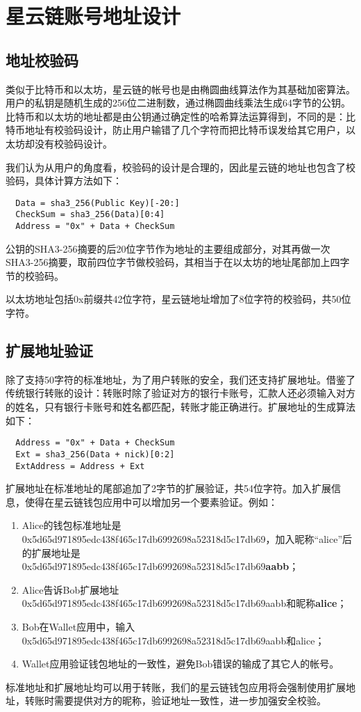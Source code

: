 \section{星云链账号地址设计}

\subsection{地址校验码}
类似于比特币和以太坊，星云链的帐号也是由椭圆曲线算法作为其基础加密算法。
用户的私钥是随机生成的256位二进制数，通过椭圆曲线乘法生成64字节的公钥。
比特币和以太坊的地址都是由公钥通过确定性的哈希算法运算得到，不同的是：比特币地址有校验码设计，防止用户输错了几个字符而把比特币误发给其它用户，以太坊却没有校验码设计。

我们认为从用户的角度看，校验码的设计是合理的，因此星云链的地址也包含了校验码，具体计算方法如下：

\begin{verbatim}
  Data = sha3_256(Public Key)[-20:]
  CheckSum = sha3_256(Data)[0:4]
  Address = "0x" + Data + CheckSum
\end{verbatim}

公钥的SHA3-256摘要的后20位字节作为地址的主要组成部分，对其再做一次SHA3-256摘要，取前四位字节做校验码，其相当于在以太坊的地址尾部加上四字节的校验码。

以太坊地址包括0x前缀共42位字符，星云链地址增加了8位字符的校验码，共50位字符。
	
\subsection{扩展地址验证}
除了支持50字符的标准地址，为了用户转账的安全，我们还支持扩展地址。借鉴了传统银行转账的设计：转账时除了验证对方的银行卡账号，汇款人还必须输入对方的姓名，只有银行卡账号和姓名都匹配，转账才能正确进行。扩展地址的生成算法如下：

\begin{verbatim}
  Address = "0x" + Data + CheckSum
  Ext = sha3_256(Data + nick)[0:2]
  ExtAddress = Address + Ext
\end{verbatim}

扩展地址在标准地址的尾部追加了2字节的扩展验证，共54位字符。加入扩展信息，使得在星云链钱包应用中可以增加另一个要素验证。例如：
\begin{enumerate}
	\item Alice的钱包标准地址是0x5d65d971895edc438f465c17db6992698a52318d5c17db69，加入昵称“alice”后的扩展地址是0x5d65d971895edc438f465c17db6992698a52318d5c17db69\textbf{aabb}；
	\item Alice告诉Bob扩展地址 0x5d65d971895edc438f465c17db6992698a52318d5c17db69aabb和昵称\textbf{alice}；
	\item Bob在Wallet应用中，输入 0x5d65d971895edc438f465c17db6992698a52318d5c17db69aabb和alice；
	\item Wallet应用验证钱包地址的一致性，避免Bob错误的输成了其它人的帐号。
\end{enumerate}
		
标准地址和扩展地址均可以用于转账，我们的星云链钱包应用将会强制使用扩展地址，转账时需要提供对方的昵称，验证地址一致性，进一步加强安全校验。
